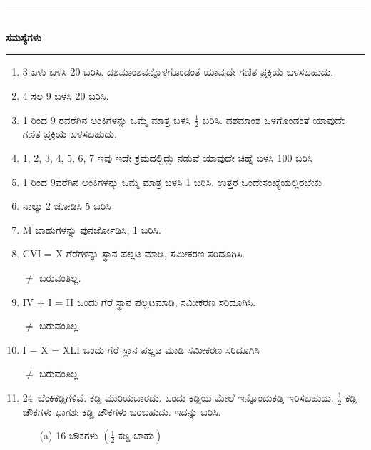 \chapter[ಅಧ್ಯಾಯ 7]{}\label{chap7}

\begin{center}
\rule{5cm}{1pt}\\[5pt]
{\Large\bfseries ಸಮಸ್ಯೆಗಳು}\\[3pt]
\rule{5cm}{1pt}
\end{center}

\begin{enumerate}
\renewcommand{\labelenumi}{\bf\theenumi.}
\itemsep=5pt

\item 3 ಏಳು ಬಳಸಿ 20 ಬರಿಸಿ. ದಶಮಾಂಶವನ್ನೊಳಗೊಂಡಂತೆ ಯಾವುದೇ ಗಣಿತ ಪ್ರಕ್ರಿಯೆ ಬಳಸಬಹುದು. 

\item 4 ಸಲ 9 ಬಳಸಿ 20 ಬರಿಸಿ. 

\item 1 ರಿಂದ 9 ರವರೆಗಿನ ಅಂಕಿಗಳನ್ನು ಒಮ್ಮೆ ಮಾತ್ರ ಬಳಸಿ $\frac{1}{2}$ ಬರಿಸಿ. ದಶಮಾಂಶ ಒಳಗೊಂಡಂತೆ ಯಾವುದೇ ಗಣಿತ ಪ್ರಕ್ರಿಯೆ ಬಳಸಬಹುದು. 

\item 1, 2, 3, 4, 5, 6, 7 ಇವು ಇದೇ ಕ್ರಮದಲ್ಲಿದ್ದು ನಡುವೆ ಯಾವುದೇ ಚಿಹ್ನೆ ಬಳಸಿ 100 ಬರಿಸಿ 

\item 1 ರಿಂದ 9ವರೆಗಿನ ಅಂಕಿಗಳನ್ನು ಒಮ್ಮೆ ಮಾತ್ರ ಬಳಸಿ 1 ಬರಿಸಿ. ಉತ್ತರ ಒಂದೇ\break ಸಂಖ್ಯೆಯಲ್ಲಿರಬೇಕು

\item ನಾಲ್ಕು 2 ಜೋಡಿಸಿ 5  ಬರಿಸಿ 

\item M ಬಾಹುಗಳನ್ನು ಪುನರ್ಜೋಡಿಸಿ, 1 ಬರಿಸಿ. 

\item CVI = X ಗೆರೆಗಳನ್ನು ಸ್ಥಾನ ಪಲ್ಲಟ ಮಾಡಿ, ಸಮೀಕರಣ ಸರಿದೂಗಿಸಿ. 

$\neq$ ಬರುವಂತಿಲ್ಲ. 

\item IV $+$ I = II ಒಂದು ಗೆರೆ ಸ್ಥಾನ ಪಲ್ಲಟಮಾಡಿ, ಸಮೀಕರಣ ಸರಿದೂಗಿಸಿ. 

$\neq$ ಬರುವಂತಿಲ್ಲ

\item I $-$ X = XLI ಒಂದು ಗೆರೆ ಸ್ಥಾನ ಪಲ್ಲಟ ಮಾಡಿ ಸಮೀಕರಣ ಸರಿದೂಗಿಸಿ 

$\neq$ ಬರುವಂತಿಲ್ಲ

\item 24~ಬೆಂಕಿಕಡ್ಡಿಗಳಿವೆ. ಕಡ್ಡಿ ಮುರಿಯಬಾರದು. ಒಂದು ಕಡ್ಡಿಯ ಮೇಲೆ ಇನ್ನೊಂದು\break ಕಡ್ಡಿ ಇರಿಸಬಹುದು. $\frac{1}{2}$ ಕಡ್ಡಿ ಚೌಕಗಳು ಭಾಗಶಃ ಕಡ್ಡಿ ಚೌಕಗಳು ಬರಬಹುದು. ಇದನ್ನು ಬರಿಸಿ. 
\begin{itemize}
\item[(a)] 16 ಚೌಕಗಳು $\left(\frac{1}{2} \text{ ಕಡ್ಡಿ ಬಾಹು}\right)$


\end{itemize}
\end{enumerate}
